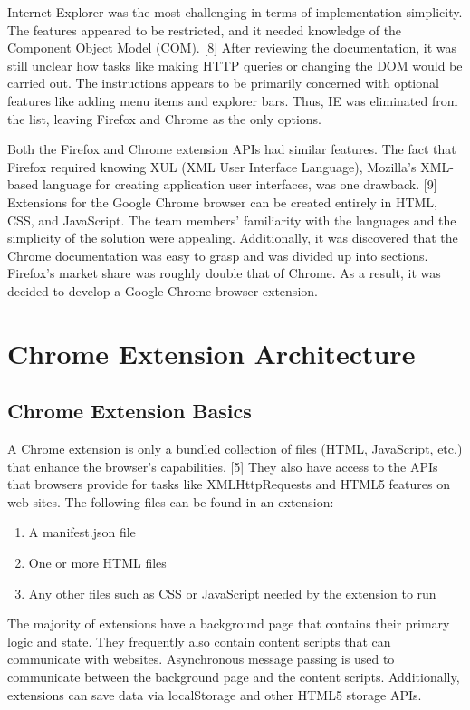 Internet Explorer was the most challenging in terms of implementation simplicity. The features appeared to be restricted, and it needed knowledge of the Component Object Model (COM). [8] After reviewing the documentation, it was still unclear how tasks like making HTTP queries or changing the DOM would be carried out. The instructions appears to be primarily concerned with optional features like adding menu items and explorer bars. Thus, IE was eliminated from the list, leaving Firefox and Chrome as the only options.

Both the Firefox and Chrome extension APIs had similar features. The fact that Firefox required knowing XUL (XML User Interface Language), Mozilla's XML-based language for creating application user interfaces, was one drawback. [9] Extensions for the Google Chrome browser can be created entirely in HTML, CSS, and JavaScript. The team members' familiarity with the languages and the simplicity of the solution were appealing. Additionally, it was discovered that the Chrome documentation was easy to grasp and was divided up into sections. Firefox's market share was roughly double that of Chrome. As a result, it was decided to develop a Google Chrome browser extension.


\section{Chrome Extension Architecture}

\subsection{Chrome Extension Basics}

A Chrome extension is only a bundled collection of files (HTML, JavaScript, etc.) that enhance the browser's capabilities. [5] They also have access to the APIs that browsers provide for tasks like XMLHttpRequests and HTML5 features on web sites. The following files can be found in an extension:

\begin{enumerate}
 \item A manifest.json file
 \item One or more HTML files
 \item Any other files such as CSS or JavaScript needed by the extension to run
\end{enumerate}

The majority of extensions have a background page that contains their primary logic and state. They frequently also contain content scripts that can communicate with websites. Asynchronous message passing is used to communicate between the background page and the content scripts. Additionally, extensions can save data via localStorage and other HTML5 storage APIs.

